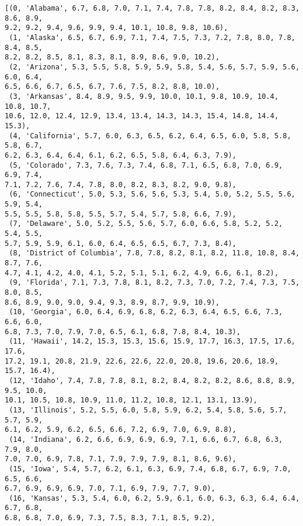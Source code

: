 \documentclass[11pt]{article}
\makeatletter
\newcommand{\boxspacing}{\kern\kvtcb@left@rule\kern\kvtcb@boxsep}
\newcommand{\prompt}[4]{
        {\ttfamily\llap{{\color{#2}[#3]:\hspace{3pt}#4}}\vspace{-\baselineskip}}
    }
\makeatother
\begin{document}
            \begin{tcolorbox}[breakable, size=fbox, boxrule=.5pt, pad at break*=1mm, opacityfill=0]
\prompt{Out}{outcolor}{49}{\boxspacing}
\begin{Verbatim}[commandchars=\\\{\}]
[(0, 'Alabama', 6.7, 6.8, 7.0, 7.1, 7.4, 7.8, 7.8, 8.2, 8.4, 8.2, 8.3, 8.6, 8.9,
9.2, 9.2, 9.4, 9.6, 9.9, 9.4, 10.1, 10.8, 9.8, 10.6),
 (1, 'Alaska', 6.5, 6.7, 6.9, 7.1, 7.4, 7.5, 7.3, 7.2, 7.8, 8.0, 7.8, 8.4, 8.5,
8.2, 8.2, 8.5, 8.1, 8.3, 8.1, 8.9, 8.6, 9.0, 10.2),
 (2, 'Arizona', 5.3, 5.5, 5.8, 5.9, 5.9, 5.8, 5.4, 5.6, 5.7, 5.9, 5.6, 6.0, 6.4,
6.5, 6.6, 6.7, 6.5, 6.7, 7.6, 7.5, 8.2, 8.8, 10.0),
 (3, 'Arkansas', 8.4, 8.9, 9.5, 9.9, 10.0, 10.1, 9.8, 10.9, 10.4, 10.8, 10.7,
10.6, 12.0, 12.4, 12.9, 13.4, 13.4, 14.3, 14.3, 15.4, 14.8, 14.4, 15.3),
 (4, 'California', 5.7, 6.0, 6.3, 6.5, 6.2, 6.4, 6.5, 6.0, 5.8, 5.8, 5.8, 6.7,
6.2, 6.3, 6.4, 6.4, 6.1, 6.2, 6.5, 5.8, 6.4, 6.3, 7.9),
 (5, 'Colorado', 7.3, 7.6, 7.3, 7.4, 6.8, 7.1, 6.5, 6.8, 7.0, 6.9, 6.9, 7.4,
7.1, 7.2, 7.6, 7.4, 7.8, 8.0, 8.2, 8.3, 8.2, 9.0, 9.8),
 (6, 'Connecticut', 5.0, 5.3, 5.6, 5.6, 5.3, 5.4, 5.0, 5.2, 5.5, 5.6, 5.9, 5.4,
5.5, 5.5, 5.8, 5.8, 5.5, 5.7, 5.4, 5.7, 5.8, 6.6, 7.9),
 (7, 'Delaware', 5.0, 5.2, 5.5, 5.6, 5.7, 6.0, 6.6, 5.8, 5.2, 5.2, 5.4, 5.5,
5.7, 5.9, 5.9, 6.1, 6.0, 6.4, 6.5, 6.5, 6.7, 7.3, 8.4),
 (8, 'District of Columbia', 7.8, 7.8, 8.2, 8.1, 8.2, 11.8, 10.8, 8.4, 8.7, 7.6,
4.7, 4.1, 4.2, 4.0, 4.1, 5.2, 5.1, 5.1, 6.2, 4.9, 6.6, 6.1, 8.2),
 (9, 'Florida', 7.1, 7.3, 7.8, 8.1, 8.2, 7.3, 7.0, 7.2, 7.4, 7.3, 7.5, 8.0, 8.5,
8.6, 8.9, 9.0, 9.0, 9.4, 9.3, 8.9, 8.7, 9.9, 10.9),
 (10, 'Georgia', 6.0, 6.4, 6.9, 6.8, 6.2, 6.3, 6.4, 6.5, 6.6, 7.3, 6.6, 6.0,
6.8, 7.3, 7.0, 7.9, 7.0, 6.5, 6.1, 6.8, 7.8, 8.4, 10.3),
 (11, 'Hawaii', 14.2, 15.3, 15.3, 15.6, 15.9, 17.7, 16.3, 17.5, 17.6, 17.6,
17.2, 19.1, 20.8, 21.9, 22.6, 22.6, 22.0, 20.8, 19.6, 20.6, 18.9, 15.7, 16.4),
 (12, 'Idaho', 7.4, 7.8, 7.8, 8.1, 8.2, 8.4, 8.2, 8.2, 8.6, 8.8, 8.9, 9.5, 10.0,
10.1, 10.5, 10.8, 10.9, 11.0, 11.2, 10.8, 12.1, 13.1, 13.9),
 (13, 'Illinois', 5.2, 5.5, 6.0, 5.8, 5.9, 6.2, 5.4, 5.8, 5.6, 5.7, 5.7, 5.9,
6.1, 6.2, 5.9, 6.2, 6.5, 6.6, 7.2, 6.9, 7.0, 6.9, 8.8),
 (14, 'Indiana', 6.2, 6.6, 6.9, 6.9, 6.9, 7.1, 6.6, 6.7, 6.8, 6.3, 7.9, 8.0,
7.0, 7.0, 6.9, 7.8, 7.1, 7.9, 7.9, 7.9, 8.1, 8.6, 9.6),
 (15, 'Iowa', 5.4, 5.7, 6.2, 6.1, 6.3, 6.9, 7.4, 6.8, 6.7, 6.9, 7.0, 6.5, 6.6,
6.7, 6.9, 6.9, 6.9, 7.0, 7.1, 6.9, 7.9, 7.7, 9.0),
 (16, 'Kansas', 5.3, 5.4, 6.0, 6.2, 5.9, 6.1, 6.0, 6.3, 6.3, 6.4, 6.4, 6.7, 6.8,
6.8, 6.8, 7.0, 6.9, 7.3, 7.5, 8.3, 7.1, 8.5, 9.2),

\end{Verbatim}
\end{tcolorbox}
\end{document}
